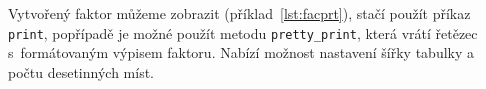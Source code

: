 %

Vytvořený faktor můžeme zobrazit (příklad~\ref{lst:facprt}), stačí použít příkaz \texttt{print}, popřípadě je možné použít metodu \texttt{pretty\_print}, která vrátí řetězec s~formátovaným výpisem faktoru.
Nabízí možnost nastavení šířky tabulky a počtu desetinných míst.

\begin{example}
\begin{Verbatim}[commandchars=\\\{\}]


\end{Verbatim}
\end{example}
